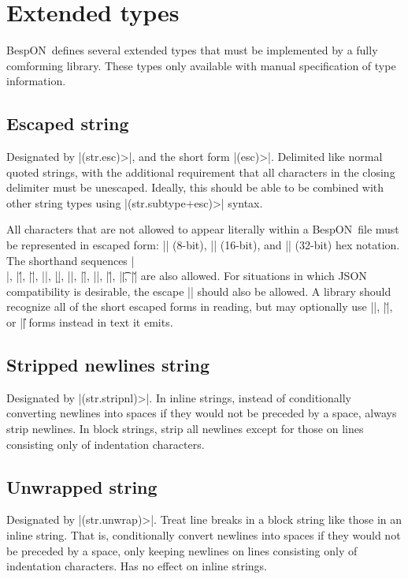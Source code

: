 \documentclass[11pt]{article}
\newcommand{\bespon}{BespON}
\begin{document}
\section{Extended types}

\bespon\ defines several extended types that must be implemented by a fully comforming library.  These types only available with manual specification of type information.


\subsection{Escaped string}

Designated by |(str.esc)>|, and the short form |(esc)>|.  Delimited like normal quoted strings, with the additional requirement that all characters in the closing delimiter must be unescaped.  Ideally, this should be able to be combined with other string types using |(str.subtype+esc)>| syntax.

All characters that are not allowed to appear literally within a \bespon\ file must be represented in escaped form: |\xHH| (8-bit), |\uHHHH| (16-bit), and |\UHHHHHHHH| (32-bit) hex notation.  The shorthand sequences |\\|, |\'|, |\"|, |\a|, |\b|, |\e|, |\f|, |\n|, |\r|, |\t|, |\v| are also allowed.  For situations in which JSON compatibility is desirable, the escape |\/| should also be allowed.  A library should recognize all of the short escaped forms in reading, but may optionally use |\x|, |\u|, or |\U| forms instead in text it emits.

\subsection{Stripped newlines string}

Designated by |(str.stripnl)>|.  In inline strings, instead of conditionally converting newlines into spaces if they would not be preceded by a space, always strip newlines.  In block strings, strip all newlines except for those on lines consisting only of indentation characters.

\subsection{Unwrapped string}

Designated by |(str.unwrap)>|.  Treat line breaks in a block string like those in an inline string.  That is, conditionally convert newlines into spaces if they would not be preceded by a space, only keeping newlines on lines consisting only of indentation characters.  Has no effect on inline strings.
\end{document}
